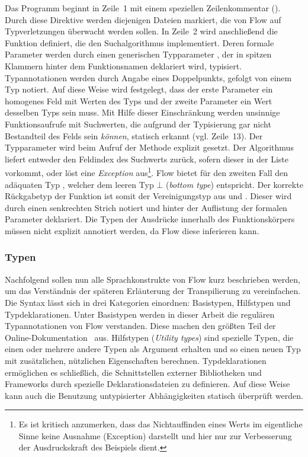 Das Programm beginnt in Zeile~1 mit einem speziellen Zeilenkommentar (). Durch diese Direktive werden diejenigen Dateien markiert, die von Flow auf Typverletzungen überwacht werden sollen. In Zeile~2 wird anschließend die Funktion  definiert, die den Suchalgorithmus implementiert. Deren formale Parameter werden durch einen generischen Typparameter , der in spitzen Klammern hinter dem Funktionsnamen deklariert wird, typisiert. Typannotationen werden durch Angabe eines Doppelpunkts, gefolgt von einem Typ notiert. Auf diese Weise wird festgelegt, dass der erste Parameter  ein homogenes Feld mit Werten des Typs  und der zweite Parameter  ein Wert desselben Typs sein muss. Mit Hilfe dieser Einschränkung werden unsinnige Funktionsaufrufe mit Suchwerten, die aufgrund der Typisierung gar nicht Bestandteil des Felds sein \emph{können}, statisch erkannt (vgl. Zeile~13). Der Typparameter  wird beim Aufruf der Methode explizit gesetzt.
Der Algorithmus liefert entweder den Feldindex des Suchwerts zurück, sofern dieser in der Liste vorkommt, oder löst eine \textit{Exception} aus\footnote{Es ist kritisch anzumerken, dass das Nichtauffinden eines Werts im eigentliche Sinne keine Ausnahme (Exception) darstellt und hier nur zur Verbesserung der Ausdruckskraft des Beispiels dient.}. Flow bietet für den zweiten Fall den adäquaten Typ , welcher dem leeren Typ $\bot$ (\textit{bottom type}) entspricht. Der korrekte Rückgabetyp der Funktion ist somit der Vereinigungstyp aus  und . Dieser wird durch einen senkrechten Strich notiert und hinter der Auflistung der formalen Parameter deklariert. Die Typen der Ausdrücke innerhalb des Funktionskörpers müssen nicht explizit annotiert werden, da Flow diese inferieren kann.

\subsubsection{Typen}

Nachfolgend sollen nun alle Sprachkonstrukte von Flow kurz beschrieben werden, um das Verständnis der späteren Erläuterung der Transpilierung zu vereinfachen. Die Syntax lässt sich in drei Kategorien einordnen: Basistypen, Hilfstypen und Typdeklarationen.
Unter Basistypen werden in dieser Arbeit die regulären Typannotationen von Flow verstanden. Diese machen den größten Teil der Online-Dokumentation~\autocite{FLOW:TYPE_ANNOTATIONS} aus.
Hilfstypen (\textit{Utility types}) sind spezielle Typen, die einen oder mehrere andere Typen als Argument erhalten und so einen neuen Typ mit zusätzlichen, nützlichen Eigenschaften berechnen.
Typdeklarationen ermöglichen es schließlich, die Schnittstellen externer Bibliotheken und Frameworks durch spezielle Deklarationsdateien zu definieren. Auf diese Weise kann auch die Benutzung untypisierter Abhängigkeiten statisch überprüft werden.

